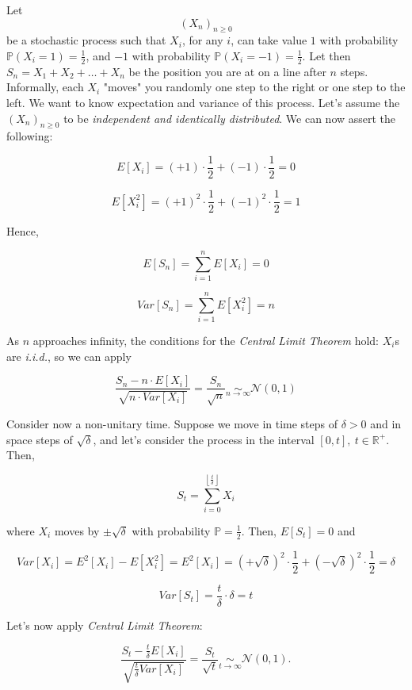 \documentclass[oneside,titlepage,headinclude,12pt,a4paper,BCOR5mm,footinclude]{book}
\theoremstyle{defn}
\begin{document}
Let   $$(X_n)_{n   \geq    0}$$   be   a   stochastic    process   such   that
\(X_i\),   for   any   \(i\),   can  take   value   \(1\)   with   probability
\(\mathbb{P}(X_i=1)=\frac{1}{2}\),     and     \(-1\)     with     probability
\(\mathbb{P}(X_i=-1)=\frac{1}{2}\). Let then \(S_n = X_1 + X_2 + \ldots +X_n\)
be the  position you  are at  on a  line after  \(n\) steps.  Informally, each
\(X_i\) "moves" you randomly one step to the right or one step to the left. We
want  to know  expectation  and variance  of this  process.  Let's assume  the
\((X_n)_{n \geq  0}\) to be \textit{independent  and identically distributed}.
We can now assert the following:

\[
  E\left[X_i\right] = (+1) \cdot \frac{1}{2} + (-1) \cdot \frac{1}{2} = 0
\]
  
\[
  E\left[X_i^2\right] = (+1)^2 \cdot \frac{1}{2} + (-1)^2 \cdot \frac{1}{2} = 1
\]

Hence,

\[
  E\left[S_n\right] = \sum_{i=1}^n E\left[X_i\right] = 0
\]

\[
  Var\left[S_n\right] = \sum_{i=1}^n E\left[X_i^2\right] = n
\]

As \(n\)  approaches infinity,  the conditions  for the  \textit{Central Limit
Theorem} hold: \(X_i\)s are \textit{i.i.d.}, so we can apply

\[
  \frac{S_n - n \cdot E\left[X_i\right]}{\sqrt{n \cdot Var\left[X_i\right]}}
  = \frac{S_n}{\sqrt{n}} \underset{n \to \infty}{\sim} \mathcal{N}(0,1)
\]

Consider now a non-unitary  time. Suppose we move in time  steps of \(\delta >
0\) and in space steps of \(\sqrt{\delta}\), and let's consider the process in
the interval $[0,t],\ t\in\mathbb{R}^+$. Then,

\[
  S_t = \sum_{i=0}^{\left\lfloor \frac{t}{\delta} \right\rfloor} X_i
\]

where     $X_i$     moves     by     $\pm\sqrt\delta$     with     probability
$\mathbb{P}=\frac{1}{2}$. Then, $E\left[S_t\right]=0$ and

\[
  Var[X_i] = E^2[X_i] - E[X_i^2] = E^2[X_i] = (+\sqrt{\delta})^2 \cdot \frac{1}{2} + (-\sqrt{\delta})^2 \cdot \frac{1}{2} 
    = \delta
\]

\[
  Var[S_t] = \frac{t}{\delta} \cdot \delta = t
\]

Let's now apply \textit{Central Limit Theorem}:

\[
  \frac{S_t - \frac{t}{\delta} E[X_i]}{\sqrt{\frac{t}{\delta} Var[X_i]}}
  = \frac{S_t}{\sqrt{t}} \underset{t \to \infty}{\sim} \mathcal{N}(0,1).
\]
\end{document}
